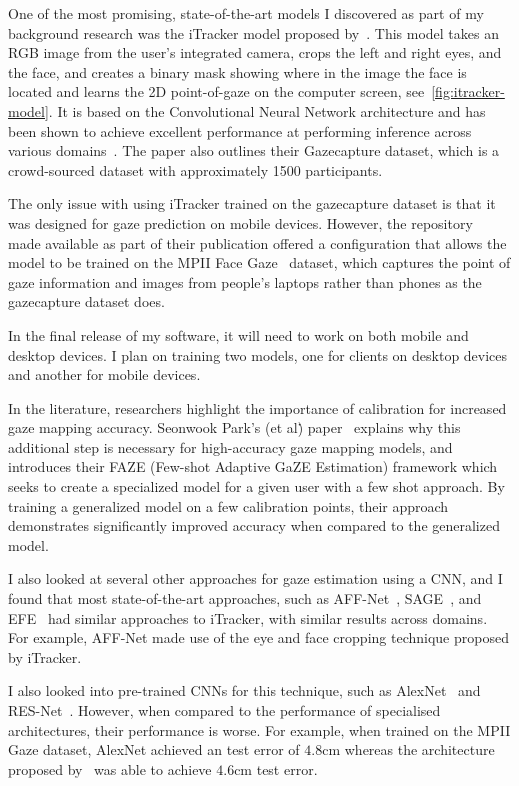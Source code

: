 \documentclass{report}
\begin{document}
One of the most promising, state-of-the-art models I discovered as part of my background research was the iTracker model proposed by~\textcite{krafka2016eye}. This model takes an RGB image from the user's integrated camera, crops the left and right eyes, and the face, and creates a binary mask showing where in the image the face is located and learns the 2D point-of-gaze on the computer screen, see~\autoref{fig:itracker-model}. It is based on the Convolutional Neural Network architecture and has been shown to achieve excellent performance at performing inference across various domains~\cite{cheng2021survey}. The paper also outlines their Gazecapture dataset, which is a crowd-sourced dataset with approximately 1500 participants. 

The only issue with using iTracker trained on the gazecapture dataset is that it was designed for gaze prediction on mobile devices. However, the repository~\cite{krafka2016eye,cheng2021survey} made available as part of their publication offered a configuration that allows the model to be trained on the MPII Face Gaze~\cite{zhang2019mpii} dataset, which captures the point of gaze information and images from people's laptops rather than phones as the gazecapture dataset does.

In the final release of my software, it will need to work on both mobile and desktop devices. I plan on training two models, one for clients on desktop devices and another for mobile devices.

In the literature, researchers highlight the importance of calibration for increased gaze mapping accuracy. Seonwook Park's (et al\.) paper~\cite{seonwook2019fewshot} explains why this additional step is necessary for high-accuracy gaze mapping models, and introduces their FAZE (Few-shot Adaptive GaZE Estimation) framework which seeks to create a specialized model for a given user with a few shot approach. By training a generalized model on a few calibration points, their approach demonstrates significantly improved accuracy when compared to the generalized model. 

I also looked at several other approaches for gaze estimation using a CNN, and I found that most state-of-the-art approaches, such as AFF-Net~\cite{bao2021adaptive}, SAGE~\cite{junfeng2019on}, and EFE~\cite{balim2023efe} had similar approaches to iTracker, with similar results across domains. For example, AFF-Net made use of the eye and face cropping technique proposed by iTracker. 

I also looked into pre-trained CNNs for this technique, such as AlexNet~\cite{krizhevsky2017imagenet} and RES-Net~\cite{deng2009imagenet}. However, when compared to the performance of specialised architectures, their performance is worse. For example, when trained on the MPII Gaze dataset, AlexNet achieved an test error of \(4.8\text{cm}\) whereas the architecture proposed by~\textcite{akinyelu2020convolutional} was able to achieve \(4.6\text{cm}\) test error.
\end{document}

